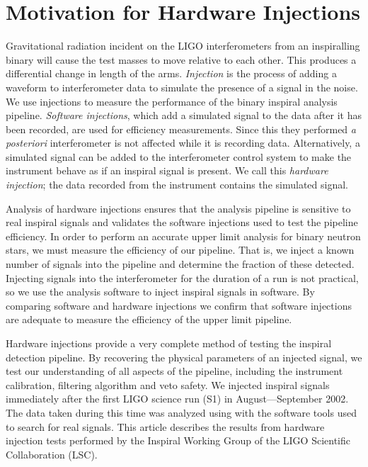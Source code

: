 
\section{Motivation for Hardware Injections}
\label{s:intro}
Gravitational radiation incident on the LIGO interferometers from an
inspiralling binary will cause the test masses to move relative to each other.
This produces a differential change in length of the arms\cite{saulson}.
\emph{Injection} is the process of adding a waveform to interferometer data to
simulate the presence of a signal in the noise. We use injections to measure
the performance of the binary inspiral analysis pipeline\cite{abbott2003b}.
\emph{Software injections}, which add a simulated signal to the data after it
has been recorded, are used for efficiency measurements. Since this they
performed \emph{a posteriori} interferometer is not affected while it is
recording data.  Alternatively, a simulated signal can be added to the
interferometer control system to make the instrument behave as if an inspiral
signal is present. We call this \emph{hardware injection}; the data recorded
from the instrument contains the simulated signal.

Analysis of hardware injections ensures that the analysis pipeline is
sensitive to real inspiral signals and validates the software injections used
to test the pipeline efficiency.  In order to perform an accurate upper limit
analysis for binary neutron stars, we must measure the efficiency of our
pipeline\cite{abbott2003b}. That is, we inject a known number of signals into
the pipeline and determine the fraction of these detected.  Injecting signals
into the interferometer for the duration of a run is not practical, so we use
the analysis software to inject inspiral signals in software.  By comparing
software and hardware injections we confirm that software injections are
adequate to measure the efficiency of the upper limit pipeline.

Hardware injections provide a very complete method of testing the inspiral
detection pipeline. By recovering the physical parameters of an injected
signal, we test our understanding of all aspects of the pipeline, including
the instrument calibration, filtering algorithm and veto safety. We injected
inspiral signals immediately after the first LIGO science run (S1) in
August---September 2002. The data taken during this time was analyzed using
with the software tools used to search for real signals.  This article
describes the results from hardware injection tests performed by the Inspiral
Working Group of the LIGO Scientific Collaboration (LSC).

